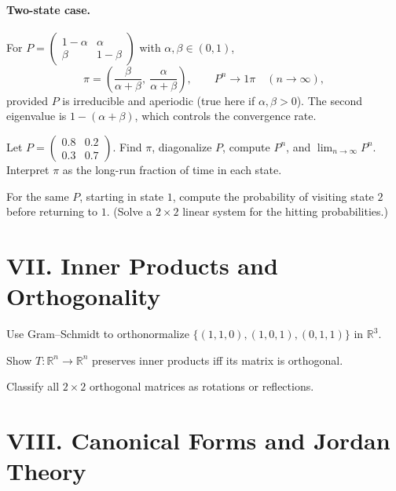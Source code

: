 \documentclass[11pt]{article}
\begin{document}
\paragraph{Two-state case.}
For $P=\begin{pmatrix}1-\alpha&\alpha\\ \beta&1-\beta\end{pmatrix}$ with $\alpha,\beta\in(0,1)$,
\[
\pi=\left(\frac{\beta}{\alpha+\beta},\ \frac{\alpha}{\alpha+\beta}\right),\qquad
P^n \to     1\pi \quad (n\to\infty),
\]
provided $P$ is irreducible and aperiodic (true here if $\alpha,\beta>0$). The second eigenvalue is $1-(\alpha+\beta)$, which controls the convergence rate.

\begin{problem}
Let $P=\begin{pmatrix}0.8&0.2\\0.3&0.7\end{pmatrix}$. Find $\pi$, diagonalize $P$, compute $P^n$, and $\lim_{n\to\infty}P^n$. Interpret $\pi$ as the long-run fraction of time in each state.
\end{problem}

\begin{problem}
For the same $P$, starting in state $1$, compute the probability of visiting state $2$ before returning to $1$. (Solve a $2\times2$ linear system for the hitting probabilities.)
\end{problem}


\section*{VII. Inner Products and Orthogonality}

\begin{problem}
Use Gram--Schmidt to orthonormalize $\{(1,1,0),(1,0,1),(0,1,1)\}$ in $\mathbb{R}^3$.
\end{problem}

\begin{problem}
Show $T:\mathbb{R}^n\to\mathbb{R}^n$ preserves inner products iff its matrix is orthogonal.
\end{problem}

\begin{problem}
Classify all $2\times 2$ orthogonal matrices as rotations or reflections.
\end{problem}

\section*{VIII. Canonical Forms and Jordan Theory}
\end{document}
